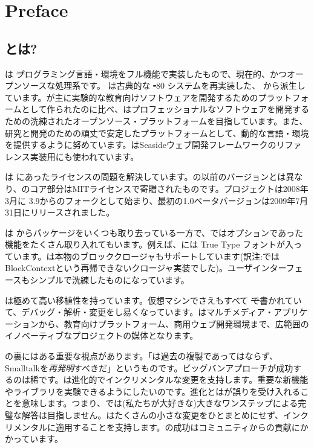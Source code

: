 \documentclass[a4paper,10pt,twoside]{book}
\begin{document}
	\sloppy
	\frontmatter
\fi
\chapter{Preface}

\section*{\pharo とは?}

\pharo は \st プログラミング言語・環境をフル機能で実装したもので、現在的、かつオープンソースな処理系です。 \pharo は古典的な \st-80 システムを再実装した、 \squeak\cite{Inga97a}から派生しています。\squeak が主に実験的な教育向けソフトウェアを開発するためのプラットフォームとして作られたのに比べ、\pharo はプロフェッショナルなソフトウェアを開発するための洗練されたオープンソース・プラットフォームを目指しています。また、研究と開発のための頑丈で安定したプラットフォームとして、動的な言語・環境を提供するように努めています。\pharo はSeasideウェブ開発フレームワークのリファレンス実装用にも使われています。

\pharo は \squeak にあったライセンスの問題を解決しています。\squeak の以前のバージョンとは異なり、\pharo のコア部分はMITライセンスで寄贈されたものです。\pharo プロジェクトは2008年3月に \squeak 3.9からのフォークとして始まり、最初の1.0ベータバージョンは2009年7月31日にリリースされました。

\pharo は \squeak からパッケージをいくつも取り去っている一方で、\squeak ではオプションであった機能をたくさん取り入れてもいます。例えば、\pharo には True Type フォントが入っています。\pharo は本物のブロッククロージャもサポートしています(訳注:\squeak ではBlockContextという再帰できないクロージャ実装でした)。ユーザインターフェースもシンプルで洗練したものになっています。

\pharo は極めて高い移植性を持っています。仮想マシンでさえもすべて \st で書かれていて、デバッグ・解析・変更をし易くなっています。\pharo はマルチメディア・アプリケーションから、教育向けプラットフォーム、商用ウェブ開発環境まで、広範囲のイノベーティブなプロジェクトの媒体となります。

\pharo の裏にはある重要な視点があります。「\pharo は過去の複製であってはならず、Smalltalkを\emph{再発明}すべきだ」というものです。ビッグバンアプローチが成功するのは稀です。\pharo は進化的でインクリメンタルな変更を支持します。重要な新機能やライブラリを実験できるようにしたいのです。進化とは\pharo が誤りを受け入れることを意味します。つまり、\pharo では(私たちが大好きな)大きなワンステップによる完璧な解答は目指しません。\pharo はたくさんの小さな変更をひとまとめにせず、インクリメンタルに適用することを支持します。\pharo の成功はコミュニティからの貢献にかかっています。
\end{document}
